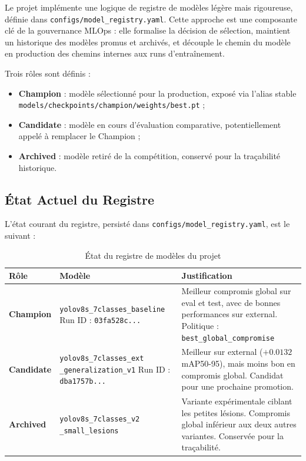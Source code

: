 \documentclass{rapportENSIAS}
\newcommand{\projectpath}[1]{\texttt{#1}}
\begin{document}
Le projet implémente une logique de registre de modèles légère mais
rigoureuse, définie dans \projectpath{configs/model\_registry.yaml}.
Cette approche est une composante clé de la gouvernance MLOps : elle
formalise la décision de sélection, maintient un historique des modèles
promus et archivés, et découple le chemin du modèle en production
des chemins internes aux runs d'entraînement.

Trois rôles sont définis :
\begin{itemize}
    \item \textbf{Champion} : modèle sélectionné pour la production,
          exposé via l'alias stable
          \projectpath{models/checkpoints/champion/weights/best.pt} ;
    \item \textbf{Candidate} : modèle en cours d'évaluation comparative,
          potentiellement appelé à remplacer le Champion ;
    \item \textbf{Archived} : modèle retiré de la compétition, conservé
          pour la traçabilité historique.
\end{itemize}

\subsection{État Actuel du Registre}

L'état courant du registre, persisté dans
\projectpath{configs/model\_registry.yaml}, est le suivant :

\begin{table}[H]
\centering
\caption{État du registre de modèles du projet}
\label{tab:registre}
\begin{tabular}{p{2cm} p{5.5cm} p{6.5cm}}
\toprule
\textbf{Rôle} & \textbf{Modèle} & \textbf{Justification} \\
\midrule
\textbf{Champion}
  & \texttt{yolov8s\_7classes\_baseline}
    Run ID : \texttt{03fa528c...}
  & Meilleur compromis global sur eval et test, avec de bonnes
    performances sur external. Politique : \texttt{best\_global\_compromise} \\
\midrule
\textbf{Candidate}
  & \texttt{yolov8s\_7classes\_ext} \newline \texttt{ \_generalization\_v1}
     \newline Run ID : \texttt{dba1757b...}
  & Meilleur sur external ($+0.0132$ mAP50-95), mais moins bon
    en compromis global. Candidat pour une prochaine promotion. \\
\midrule
\textbf{Archived}
  & \texttt{yolov8s\_7classes\_v2} \newline \texttt{  \_small\_lesions}
  & Variante expérimentale ciblant les petites lésions. Compromis
    global inférieur aux deux autres variantes. Conservée pour
    la traçabilité. \\
\bottomrule
\end{tabular}
\end{table}
\end{document}
